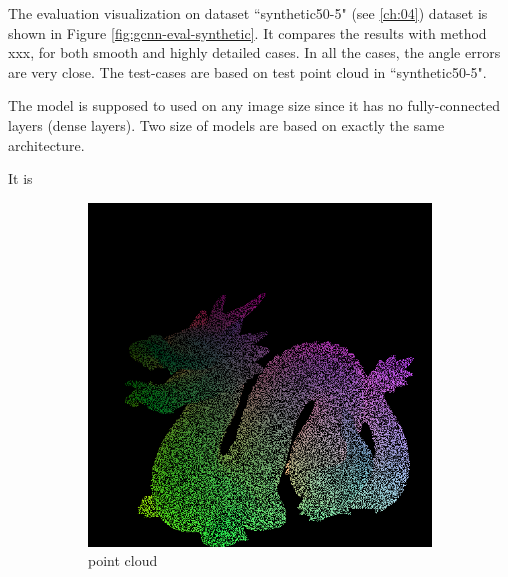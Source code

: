 The evaluation visualization on dataset ``synthetic50-5" (see \ref{ch:04}) dataset is shown in Figure \ref{fig:gcnn-eval-synthetic}. It compares the results with method xxx, for both smooth and highly detailed cases. In all the cases, the angle errors are very close. The test-cases are based on test point cloud in ``synthetic50-5". 

The model is supposed to used on any image size since it has no fully-connected layers (dense layers). Two size of models are based on exactly the same architecture. 

It is 

\begin{figure}[h!]
	\centering
	\begin{subfigure}[b]{0.24\linewidth}
		\includegraphics[width=\linewidth]{./Figures/gcnn-synthetic/fancy_eval_3_point_cloud_noise.png}
		\caption{point cloud}
	\end{subfigure}
	\begin{subfigure}[b]{0.24\linewidth}

\end{subfigure}
\end{figure}
